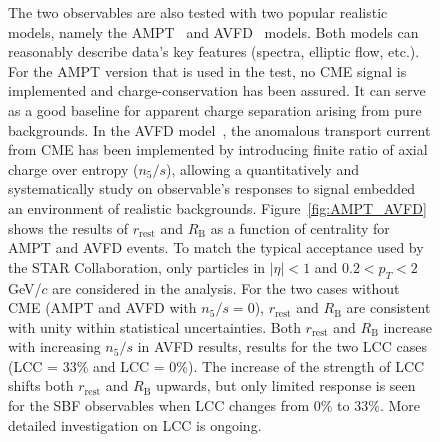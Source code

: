 \begin{figure}[htbp]
The two observables are also tested with two popular realistic models, namely  the AMPT~\cite{amptLin:2004}  and  AVFD~\cite{avfdref} models. Both models can reasonably describe data's key features (spectra,  elliptic flow, etc.).  For the AMPT version that is used in the test, no CME signal is implemented and charge-conservation has been assured. It can serve as a good baseline for apparent charge separation arising from pure backgrounds.
In the  AVFD model~\cite{avfdref}, the anomalous transport current from CME has been implemented by introducing finite ratio of axial charge over entropy ($n_{5}/s$),
allowing a  quantitatively and systematically study on observable's responses to signal embedded an environment of realistic backgrounds.  
Figure~\ref{fig:AMPT_AVFD} shows the results of  $r_{\mathrm{rest}}$ and $R_{\mathrm{B}}$ as a function of centrality for AMPT and AVFD events. To match the typical acceptance used by the STAR Collaboration, only particles in $|\eta|<1$ and $0.2 < p_{T} < 2$ GeV/$c$ are considered in the analysis.
For the two cases without  CME (AMPT and AVFD with $n_{5}/s = 0$), $r_{\mathrm{rest}}$ and $R_{\mathrm{B}}$ are consistent with unity within statistical uncertainties.  Both $r_{\mathrm{rest}}$ and $R_{\mathrm{B}}$ increase with increasing $n_{5}/s$ in AVFD results, results for the two LCC cases  (LCC =  33\% and LCC = 0\%).  The increase of the strength of LCC shifts both $r_{\mathrm{rest}}$ and $R_{\mathrm{B}}$ upwards, but only limited response is seen for the SBF observables when LCC changes from 0\% to 33\%. More detailed investigation on LCC is ongoing. 

\vspace{-0.08cm}

\vspace{-0.08cm}


\end{figure}
